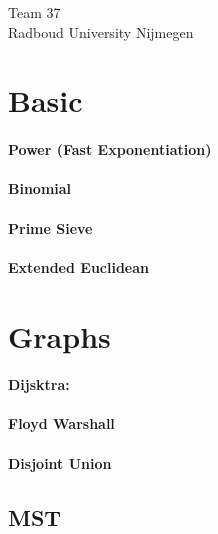 \documentclass[a4paper]{article}
\begin{document}
\null\vfill
\begin{center}
{\huge Team 37}\\
\vspace{10cm}
{\large Radboud University Nijmegen}
\end{center}
\vfill
\thispagestyle{empty} %
\newpage

\clearpage
\setcounter{page}{1}


\section{Basic} 
\paragraph{Power (Fast Exponentiation)} \hfill

\paragraph{Binomial} \hfill

\paragraph{Prime Sieve} \hfill

\paragraph{Extended Euclidean} \hfill

\section{Graphs}
\paragraph{Dijsktra:} \hfill

\paragraph{Floyd Warshall} \hfill

\paragraph{Disjoint Union} \hfill

\subsection{MST}
\end{document}
